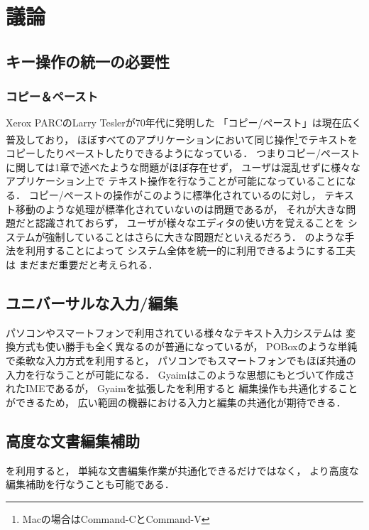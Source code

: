 \chapter{議論}

\section{キー操作の統一の必要性}

\subsection{コピー＆ペースト}
Xerox PARCのLarry Teslerが70年代に発明した\cite{Tesler:CopyPaste}
「コピー/ペースト」は現在広く普及しており，
ほぼすべてのアプリケーションにおいて同じ操作\footnote{
  Macの場合はCommand-CとCommand-V
}でテキストをコピーしたりペーストしたりできるようになっている．
つまりコピー/ペーストに関しては1章で述べたような問題がほぼ存在せず，
ユーザは混乱せずに様々なアプリケーション上で
テキスト操作を行なうことが可能になっていることになる．
コピー/ペーストの操作がこのように標準化されているのに対し，
テキスト移動のような処理が標準化されていないのは問題であるが，
それが大きな問題だと認識されておらず，
ユーザが様々なエディタの使い方を覚えることを
システムが強制していることはさらに大きな問題だといえるだろう．
{\system}のような手法を利用することによって
システム全体を統一的に利用できるようにする工夫は
まだまだ重要だと考えられる．

\section{ユニバーサルな入力/編集}

パソコンやスマートフォンで利用されている様々なテキスト入力システムは
変換方式も使い勝手も全く異なるのが普通になっているが，
POBox\cite{Masui:POBox}のような単純で柔軟な入力方式を利用すると，
パソコンでもスマートフォンでもほぼ共通の入力を行なうことが可能になる．
Gyaimはこのような思想にもとづいて作成されたIMEであるが，
Gyaimを拡張した{\system}を利用すると
編集操作も共通化することができるため，
広い範囲の機器における入力と編集の共通化が期待できる．

\section{高度な文書編集補助}

{\system}を利用すると，
単純な文書編集作業が共通化できるだけではなく，
より高度な編集補助を行なうことも可能である．


